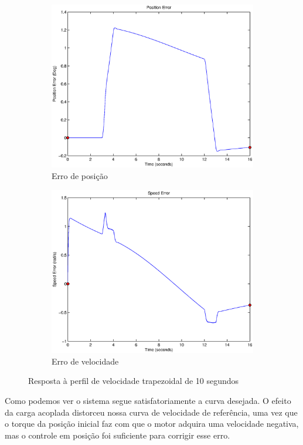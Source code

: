 \documentclass{article}
\begin{document}
\begin{figure}[H]
\begin{subfigure}{0.3\textwidth}
		\includegraphics[width=\linewidth]{matlab/ep4}
		\caption{Erro de posição}
	\end{subfigure}
	\begin{subfigure}{0.3\textwidth}
		\includegraphics[width=\linewidth]{matlab/ew4}
		\caption{Erro de velocidade}
	\end{subfigure}
	\caption{Resposta à perfil de velocidade trapezoidal de 10 segundos}	
	\label{fig:sim4res}
\end{figure}

Como podemos ver o sistema segue satisfatoriamente a curva desejada. O efeito da carga acoplada distorceu nossa curva de velocidade de referência, uma vez que o torque da posição inicial faz com que o motor adquira uma velocidade negativa, mas o controle em posição foi suficiente para corrigir esse erro.
\end{document}
